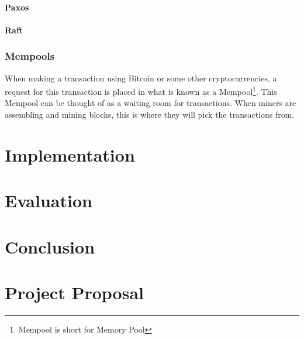 \documentclass[12pt,a4paper,twoside,openright]{report}
\begin{document}
			\subsubsection*{Paxos}
			\subsubsection*{Raft}
		\subsection{Mempools}
			When making a transaction using Bitcoin or some other cryptocurrencies, a request for this transaction is placed in what is known as a Mempool\footnote{Mempool is short for Memory Pool}.
			This Mempool can be thought of as a waiting room for transactions. When miners are assembling and mining blocks, this is where they will pick the transactions from.
	\chapter{Implementation}
	
	\chapter{Evaluation}
	
	\chapter{Conclusion}
	
	
	
	
	
	\appendix

	\chapter{Project Proposal}
	
	
	
	
\end{document}
